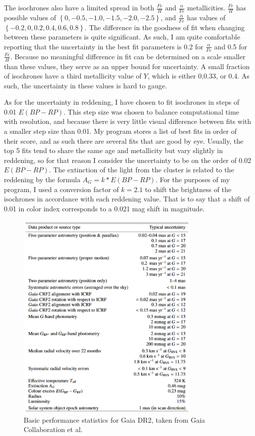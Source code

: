 \documentclass[aps,prb,twocolumn,groupedaddress,nofootinbib,floatfix]{revtex4-1}
\begin{document}
The isochrones also have a limited spread in both $\frac{Fe}{H}$ and $\frac{\alpha}{Fe}$ metallicities. $\frac{Fe}{H}$ has possible values of $\left\{0,-0.5,-1.0,-1.5,-2.0,-2.5\right\}$, and $\frac{\alpha}{Fe}$ has values of $\left\{-0.2,0,0.2,0.4,0.6,0.8\right\}$. The difference in the goodness of fit when changing between these parameters is quite significant. As such, I am quite comfortable reporting that the uncertainty in the best fit parameters is 0.2 for $\frac{\alpha}{Fe}$ and 0.5 for $\frac{Fe}{H}$. Because no meaningful difference in fit can be determined on a scale smaller than these values, they serve as an upper bound for uncertainty. A small fraction of isochrones have a third metallicity value of $Y$, which is either 0,0.33, or 0.4. As such, the uncertainty in these values is hard to gauge.

As for the uncertainty in reddening, I have chosen to fit isochrones in steps of 0.01 $E(BP-RP)$. This step size was chosen to balance computational time with resolution, and because there is very little visual difference between fits with a smaller step size than 0.01. My program stores a list of best fits in order of their score, and as such there are several fits that are good by eye. Usually, the top 5 fits tend to share the same age and metallicity but vary slightly in reddening, so for that reason I consider the uncertainty to be on the order of 0.02 $E(BP-RP)$. The extinction of the light from the cluster is related to the reddening by the formula $A_G = k*E(BP-RP)$. For the purposes of my program, I used a conversion factor of $k=2.1$ to shift the brightness of the isochrones in accordance with each reddening value. That is to say that a shift of 0.01 in color index corresponds to a 0.021 mag shift in magnitude.

\begin{figure}[!h]
	\centering
      \includegraphics[width=3.5in]{gaiaTable.pdf}
	\caption{Basic performance statistics for Gaia DR2, taken from Gaia Collaboration et al.}
	\label{fig:gaiaTable}
\end{figure}
\end{document}
